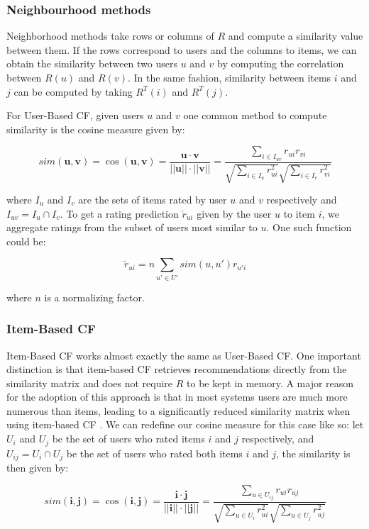 \documentclass[cic,tc,english]{iiufrgs}
\begin{document}
\subsubsection{Neighbourhood methods}
Neighborhood methods take rows or columns of \(R\) and compute a similarity value between them. If the rows correspond to users and the columns to items, we can obtain the similarity between two users \(u\) and \(v\) by computing the correlation between \(R(u)\) and \(R(v)\). In the same fashion, similarity between items \(i\) and \(j\) can be computed by taking \(R^T(i)\) and \(R^T(j)\).

For User-Based CF, given users \(u\) and \(v\) one common method to compute similarity is the cosine measure given by:

\[sim(\pmb u, \pmb v) = \cos(\pmb u, \pmb v) = \frac {\pmb u \cdot \pmb v}{||\pmb u|| \cdot ||\pmb v||} = \frac{\sum_{i \in I_{uv}} r_{ui}r_{vi}}{\sqrt{\sum_{i \in I_u} r_{ui}^2}\sqrt{\sum_{i \in I_v} r_{vi}^2}}\]

where $I_u$ and $I_v$ are the sets of items rated by user $u$ and $v$ respectively and $I_{uv} = I_u \cap I_v$. 
To get a rating prediction $\check{r}_{ui}$ given by the user $u$ to item $i$, we aggregate ratings from the subset of users most similar to $u$. One such function could be:

$$
\check{r}_{ui} = n \sum_{u' \in U'} sim(u, u')r_{u'i}
$$

where $n$ is a normalizing factor.

\subsubsection{Item-Based CF}
Item-Based CF works almost exactly the same as User-Based CF. One important distinction is that item-based CF retrieves recommendations directly from the similarity matrix and does not require $R$ to be kept in memory. A major reason for the adoption of this approach is that in most systems users are much more numerous than items, leading to a significantly reduced similarity matrix when using item-based CF \cite{Sarwar2001}. We can redefine our cosine measure for this case like so: let $U_i$ and $U_j$ be the set of users who rated items $i$ and $j$ respectively, and $U_{ij} = U_i \cap U_j$ be the set of users who rated both items $i$ and $j$, the similarity is then given by:


\[sim(\pmb i, \pmb j) = \cos(\pmb i, \pmb j) = \frac {\pmb i \cdot \pmb j}{||\pmb i|| \cdot ||\pmb j||} = \frac{\sum_{u \in U_{ij}} r_{ui}r_{uj}}{\sqrt{\sum_{u \in U_i} r_{ui}^2}\sqrt{\sum_{u \in U_j} r_{uj}^2}}\]
\end{document}
